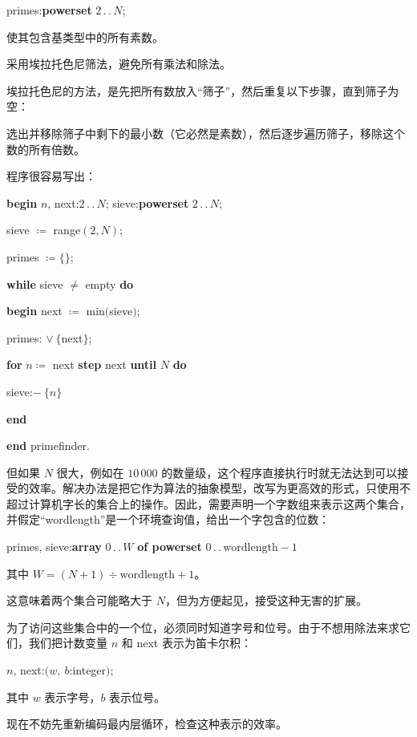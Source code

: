 \documentclass[twoside,11pt,fontset=none]{ctexbook}
\begin{document}
\quad primes:\textbf{powerset} $2\,.\,.\,N$;

\noindent
使其包含基类型中的所有素数。

\noindent
采用埃拉托色尼筛法，避免所有乘法和除法。

埃拉托色尼的方法，是先把所有数放入“筛子”，然后重复以下步骤，直到筛子为空：

\noindent
选出并移除筛子中剩下的最小数（它必然是素数），然后逐步遍历筛子，移除这个数的所有倍数。

程序很容易写出：

\noindent
\textbf{begin} $n$, next:$2\,.\,.\,N$; sieve:\textbf{powerset} $2\,.\,.\,N$;

\noindent
\quad sieve $\coloneq$ range$(2, N)$;

\noindent
\quad primes $\coloneq \{\}$;

\noindent
\quad \textbf{while} sieve $\neq$ empty \textbf{do}

\noindent
\quad \quad \textbf{begin} next $\coloneq$ min$($sieve$)$;

\noindent
\quad \quad \quad primes: $\vee\ \{$next$\}$;

\noindent
\quad \quad \quad \textbf{for} $n\coloneq$ next \textbf{step} next \textbf{until} $N$ \textbf{do}

\noindent
\quad \quad \quad \quad sieve:$-\ \{n\}$

\noindent
\quad \quad \textbf{end}

\noindent
\textbf{end} primefinder.

但如果 $N$ 很大，例如在 $10\,000$ 的数量级，这个程序直接执行时就无法达到可以接受的效率。解决办法是把它作为算法的抽象模型，改写为更高效的形式，只使用不超过计算机字长的集合上的操作。因此，需要声明一个字数组来表示这两个集合，并假定“wordlength”是一个环境查询值，给出一个字包含的位数：

\quad primes, sieve:\textbf{array} $0\,.\,.\,W$ \textbf{of powerset} $0\,.\,.\,\text{wordlength} - 1$

\noindent
其中 $W = (N + 1) \div \text{wordlength} + 1$。

\noindent
这意味着两个集合可能略大于 $N$，但为方便起见，接受这种无害的扩展。

为了访问这些集合中的一个位，必须同时知道字号和位号。由于不想用除法来求它们，我们把计数变量 $n$ 和 next 表示为笛卡尔积：

\quad $n$, next:$(w,\ b$:integer$)$;

\noindent
其中 $w$ 表示字号，$b$ 表示位号。

现在不妨先重新编码最内层循环，检查这种表示的效率。
\end{document}
